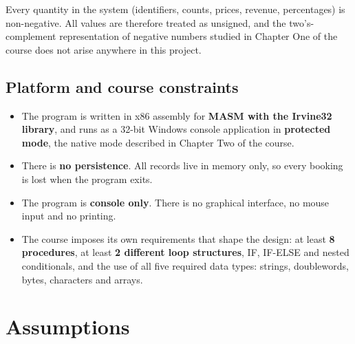 \documentclass{thesis-library}
\begin{document}
Every quantity in the system (identifiers, counts, prices, revenue, percentages) is non-negative. All values are therefore treated as unsigned, and the two's-complement representation of negative numbers studied in Chapter One of the course does not arise anywhere in this project.

\subsection{Platform and course constraints}

\begin{itemize}
\item The program is written in x86 assembly for \textbf{MASM with the Irvine32 library}, and runs as a 32-bit Windows console application in \textbf{protected mode}, the native mode described in Chapter Two of the course.
\item There is \textbf{no persistence}. All records live in memory only, so every booking is lost when the program exits.
\item The program is \textbf{console only}. There is no graphical interface, no mouse input and no printing.
\item The course imposes its own requirements that shape the design: at least \textbf{8 procedures}, at least \textbf{2 different loop structures}, IF, IF-ELSE and nested conditionals, and the use of all five required data types: strings, doublewords, bytes, characters and arrays.
\end{itemize}

\section{Assumptions}
\end{document}
